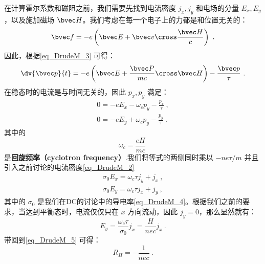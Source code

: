 在计算霍尔系数和磁阻之前，我们需要先找到电流密度 $j_x,j_y$ 和电场的分量 $E_x,E_y$，以及施加磁场 $\bvec H$。我们考虑在每一个电子上的力都是和位置无关的：
\begin{equation}
\bvec f = -e\left(\bvec E +\bvec v\cross \frac{\bvec H}{c}\right)~.
\end{equation}
因此，根据\autoref{eq_DrudeM_3} 可得：
\begin{equation}\label{eq_DrudeM_8}
\dv{\bvec p}{t}=-e\left(\bvec E +\frac{\bvec P}{mc}\cross \bvec H\right)-\frac{\bvec p}{\tau}~.
\end{equation}
在稳态时的电流是与时间无关的，因此 $p_x,p_y$ 满足：
\begin{align}
0=-eE_x-\omega_c p_y -\frac{p_x}{\tau}~,\\
0=-eE_y+\omega_c p_y -\frac{p_y}{\tau}~.
\end{align}
其中的
\begin{equation}
\omega_c = \frac{eH}{mc}~
\end{equation}
是\textbf{回旋频率（cyclotron frequency）}.我们将等式的两侧同时乘以 $-ne\tau/m$ 并且引入之前讨论的电流密度\autoref{eq_DrudeM_2} 
\begin{align}
\sigma_0 E_x = \omega_c \tau j_y+j_x~,\\
\sigma_0 E_y = \omega_c \tau j_x+j_y~,
\end{align}
其中的 $\sigma_0$ 是我们在DC的讨论中的导电率\autoref{eq_DrudeM_4}。根据我们之前的要求，当达到平衡态时，电流仅仅只在 $x$ 方向流动，因此 $j_y = 0$，那么显然就有：
\begin{equation}
 E_y = \frac{\omega_c \tau }{\sigma_0}j_x=\frac{H}{nec}j_x~.
\end{equation}
带回到\autoref{eq_DrudeM_5} 可得：
\begin{equation}
R_H=-\frac{1}{nec}~.
\end{equation}

